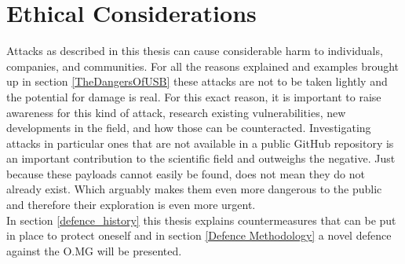 \section{Ethical Considerations}
Attacks as described in this thesis can cause considerable harm to individuals, companies, and communities. For all the reasons explained and examples brought up in section \ref{TheDangersOfUSB} these attacks are not to be taken lightly and the potential for damage is real. For this exact reason, it is important to raise awareness for this kind of attack, research existing vulnerabilities, new developments in the field, and how those can be counteracted. Investigating attacks in particular ones that are not available in a public GitHub repository is an important contribution to the scientific field and outweighs the negative. Just because these payloads cannot easily be found, does not mean they do not already exist. Which arguably makes them even more dangerous to the public and therefore their exploration is even more urgent. \\
In section \ref{defence_history} this thesis explains countermeasures that can be put in place to protect oneself and in section \ref{Defence Methodology} a novel defence against the O.MG will be presented. 


